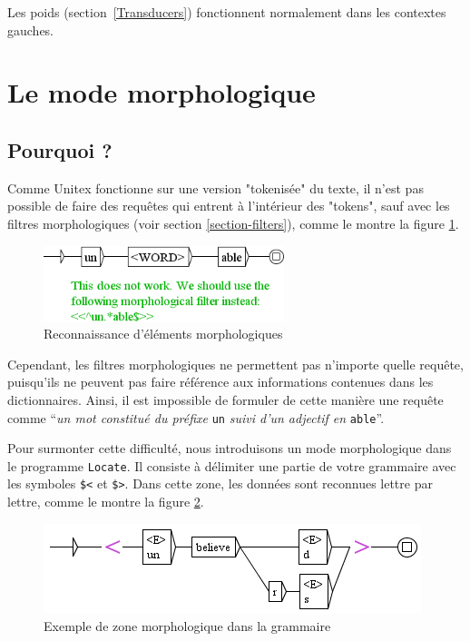 \bigskip
\noindent Les poids (section~\ref{Transducers}) fonctionnent normalement dans les contextes gauches.

\clearpage

\section{Le mode morphologique}
\label{section-morphological-mode}
\subsection{Pourquoi ?}
Comme Unitex fonctionne sur une version "tokenisée" du texte, il n'est pas possible de
faire des requêtes qui entrent à l'intérieur des "tokens", sauf avec les filtres morphologiques
(voir section \ref{section-filters}), comme le montre la figure
\ref{fig-morpho1}.

\begin{figure}[!ht]
\begin{center}
\includegraphics[width=7cm]{resources/img/fig6-17k.png}
\caption{Reconnaissance d'éléments morphologiques\label{fig-morpho1}}
\end{center}
\end{figure}

\bigskip
\noindent Cependant, les filtres morphologiques ne permettent pas n'importe quelle requête, puisqu'ils ne
peuvent pas faire référence aux informations contenues dans les dictionnaires. Ainsi, il est impossible de formuler de cette 
manière une requête comme ``\textit{un mot constitué du préfixe} \verb$un$ \textit{suivi d'un adjectif en} \verb+able+''.

\bigskip
\noindent Pour surmonter cette difficulté, nous introduisons un mode morphologique dans le programme
\verb$Locate$. Il consiste à délimiter une partie de votre  grammaire avec les 
symboles \verb+$<+ et \verb+$>+.\index{\verbc{$<}}\index{\verbc{$>}}
Dans cette zone, les données sont reconnues lettre par lettre, comme le montre la figure
\ref{fig-morpho2}.

\begin{figure}[!ht]
\begin{center}
\includegraphics[width=11cm]{resources/img/fig6-17l.png}
\caption{Exemple de zone morphologique dans la grammaire\label{fig-morpho2}}
\end{center}
\end{figure}

